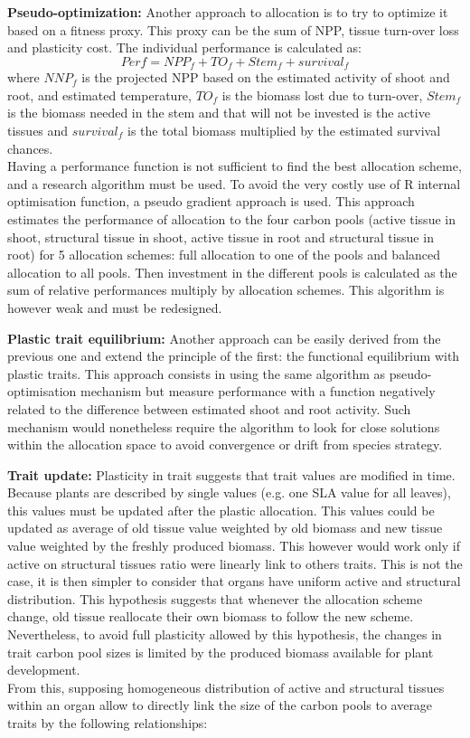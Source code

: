 \documentclass[a4paper,twoside, justified,marginals=raggedright, nobib]{tufte-handout}
\begin{document}
\textbf{Pseudo-optimization:} Another approach to allocation is to try to optimize it based on a fitness proxy. This proxy can  be the sum of NPP, tissue turn-over loss and plasticity cost. The individual performance is calculated as:
\begin{equation}
Perf = NPP_{f} + TO_{f} + Stem_{f} + survival_{f}
\end{equation}
where $NNP_{f}$ is the projected NPP based on the estimated activity of shoot and root, and estimated temperature, $TO_{f}$ is the biomass lost due to turn-over, $Stem_{f}$ is the biomass needed in the stem and that will not be invested is the active tissues and $survival_{f}$ is the total biomass multiplied by the estimated survival chances.\\
\indent Having a performance function is not sufficient to find the best allocation scheme, and a research algorithm must be used. To avoid the very costly use of R internal optimisation function, a pseudo gradient approach is used. This approach estimates the performance of allocation to the four carbon pools (active tissue in shoot, structural tissue in shoot, active tissue in root and structural tissue in root) for 5 allocation schemes: full allocation to one of the pools and balanced allocation to all pools. Then investment in the different pools is calculated as the sum of relative performances multiply by allocation schemes. This algorithm is however weak and must be redesigned.

\textbf{Plastic trait equilibrium:} Another approach can be easily derived from the previous one and extend the principle of the first: the functional equilibrium with plastic traits. This approach consists in using the same algorithm as pseudo-optimisation mechanism but measure performance with a function negatively related to the difference between estimated shoot and root activity. Such mechanism would nonetheless require the algorithm to look for close solutions within the allocation space to avoid convergence or drift from species strategy.


\textbf{Trait update:}
Plasticity in trait suggests that trait values are modified in time. Because plants are described by single values (e.g. one SLA value for all leaves), this values must be updated after the plastic allocation. This values could be updated as average of old tissue value weighted by old biomass and new tissue value weighted by the freshly produced biomass. This however would work only if active on structural tissues ratio were linearly link to others traits. This is not the case, it is then simpler to consider that organs have uniform active and structural distribution. This hypothesis suggests that whenever the allocation scheme change, old tissue reallocate their own biomass to follow the new scheme. Nevertheless, to avoid full plasticity allowed by this hypothesis, the changes in trait carbon pool sizes is limited by the produced biomass available for plant development.\\
\indent From this, supposing homogeneous distribution of active and structural tissues within an organ allow to directly link the size of the carbon pools to average traits by the following relationships:
\end{document}
